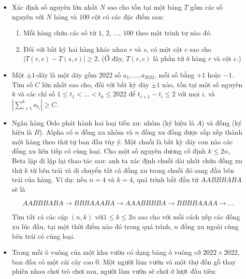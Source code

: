 \documentclass[11pt]{scrartcl}
\begin{document}
\begin{itemize}[label=, leftmargin=0em, itemsep=-0em]
    \item \begin{btvn}
        Xác định số nguyên lớn nhất $N$ sao cho tồn tại một bảng $T$ gồm các số nguyên với $N$ hàng và $100$ cột có các đặc điểm sau:
        \begin{enumerate}
            \item Mỗi hàng chứa các số từ $1$, $2$, $\ldots$, $100$ theo một trình tự nào đó.
            \item Đối với bất kỳ hai hàng khác nhau $r$ và $s$, có một cột $c$ sao cho $|T(r,c) - T(s, c)|\geq 2$. (Ở đây, $T(r,c)$ là phần tử ở hàng $r$ và cột $c$.)
        \end{enumerate}    
    \end{btvn}
    \item\begin{btvn}
        Một $\pm 1$-dãy là một dãy gồm 2022 số $a_1, \ldots, a_{2022}$, mỗi số bằng $+1$ hoặc $-1$. Tìm số $C$ lớn nhất sao cho, đối với bất kỳ dãy $\pm 1$ nào, tồn tại một số nguyên $k$ và các chỉ số $1 \le t_1 < \ldots < t_k \le 2022$ để $t_{i+1} - t_i \le 2$ với mọi $i$, và $\displaystyle \left| \sum_{i+1}^{k} a_{t_i} \right| \ge C$.
    \end{btvn}

    
    \item\begin{btvn} Ngân hàng Oslo phát hành hai loại tiền xu: nhôm (ký hiệu là $A$) và đồng (ký hiệu là $B$). Alpha có $n$ đồng xu nhôm và $n$ đồng xu đồng được sắp xếp thành một hàng theo thứ tự ban đầu tùy ý. Một chuỗi là bất kỳ dãy con nào các đồng xu liên tiếp có cùng loại. Cho một số nguyên dương cố định $k \leq 2n$, Beta lặp đi lặp lại thao tác sau: anh ta xác định chuỗi dài nhất chứa đồng xu thứ $k$ từ bên trái và di chuyển tất cả đồng xu trong chuỗi đó sang đầu bên trái của hàng. Ví dụ: nếu $n=4$ và $k=4$, quá trình bắt đầu từ $AABBBABA$ sẽ là

        \[AABBBABA \to BBBAAABA \to AAABBBBA \to BBBBAAAA \to ...\]
        
        Tìm tất cả các cặp $(n,k)$ với$ 1 \leq k \leq 2n$ sao cho với mỗi cách xếp các đồng xu lúc đầu, tại một thời điểm nào đó trong quá trình, $n$ đồng xu ngoài cùng bên trái có cùng loại.
    \end{btvn}

    \item\begin{btvn} Trong mỗi ô vuông của một khu vườn có dạng bảng ô vuông cỡ $2022 \times 2022$, ban đầu có một cái cây cao $0$. Một người làm vườn và một thợ đốn gỗ thay phiên nhau chơi trò chơi sau, người làm vườn sẽ chơi ở lượt đầu tiên:


\end{btvn}
\end{itemize}
\end{document}
